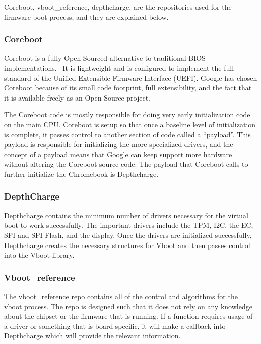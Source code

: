 Coreboot, vboot\_reference, depthcharge, are the repositories used for the firmware boot process, and they are explained below. 

\subsubsection{Coreboot}

Coreboot is a fully Open-Sourced alternative to traditional BIOS implementations.~\cite{coreboot}
It is lightweight and is configured to implement the full standard of the Unified Extensible Firmware Interface (UEFI).
Google has chosen Coreboot because of its small code footprint, full extensibility, and the fact that it is available freely as an Open Source project.

The Coreboot code is mostly responsible for doing very early initialization code on the main CPU\@. 
Coreboot is setup so that once a baseline level of initialization is complete, it passes control to another section of code called a ``payload''.
This payload is responsible for initializing the more specialized drivers, and the concept of a payload means that Google can keep support more hardware without altering the Coreboot source code.
The payload that Coreboot calls to further initialize the Chromebook is Depthcharge.


\subsubsection{DepthCharge}

Depthcharge contains the minimum number of drivers necessary for the virtual boot to work successfully. 
The important drivers include the TPM, I2C, the EC, SPI and SPI Flash, and the display.
Once the drivers are initialized successfully, Depthcharge creates the necessary structures for Vboot and then passes control into the Vboot library.

\subsubsection{Vboot\_reference}

The vboot\_reference repo contains all of the control and algorithms for the vboot process.
The repo is designed such that it does not rely on any knowledge about the chipset or the firmware that is running. 
If a function requires usage of a driver or something that is board specific, it will make a callback into Depthcharge which will provide the relevant information.

